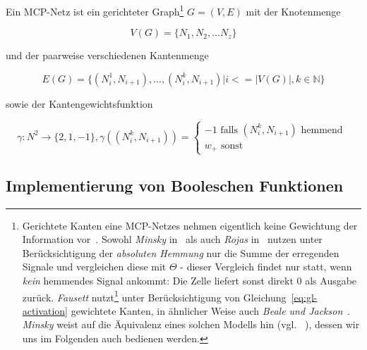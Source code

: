 \begin{definition} Ein MCP-Netz ist ein gerichteter Graph\footnote{
    Gerichtete Kanten eine MCP-Netzes nehmen eigentlich keine Gewichtung der Information vor~\cite[40]{Roj93}. Sowohl \textit{Minsky} in~\cite[34]{Min67} als auch \textit{Rojas} in~\cite[32]{Roj93} nutzen unter Berücksichtigung der \textit{absoluten Hemmung} nur die Summe der erregenden Signale und vergleichen diese mit $\Theta$ - dieser Vergleich findet nur statt, wenn \textit{kein} hemmendes Signal ankommt: Die Zelle liefert sonst direkt $0$ als Ausgabe zurück. \textit{Fausett} nutzt\footnote{
        Gewichte sind in absolut hemmenden Leitungen unsinnig nach~\cite[42]{Roj93}
    } unter Berücksichtigung von Gleichung~\ref{eq:gl-activation} gewichtete Kanten, in ähnlicher Weise auch \textit{Beale und Jackson}~\cite[41]{BJ90}. \textit{Minsky} weist auf die Äquivalenz eines solchen Modells hin (vgl. ~\cite[34 f.]{Min67}), dessen wir uns im Folgenden auch bedienen werden.
} $G = (V, E)$ mit der Knotenmenge

\begin{equation}
V(G) =\{N_1, N_2, ... N_z\}
\end{equation}

und der paarweise verschiedenen Kantenmenge

\begin{equation}
E(G) = \{ (N^1_i, N_{i+1}), ..., (N^k_i, N_{i+1}) | i <= |V(G)|, k \in \mathbb{N} \}
\end{equation}

sowie der Kantengewichtsfunktion



\begin{equation}
\gamma: N^2 \to \{2, 1, -1\}, \gamma((N^k_i, N_{i+1})) = \begin{cases}
                                                              -1 \text{ falls } (N^k_i, N_{i+1})  \text{ hemmend } \\
                                                              w_+  \text{ sonst}
\end{cases}
\end{equation}
\label{def:mcpnetz}
\end{definition}



\subsection{Implementierung von Booleschen Funktionen}\label{seq-mcpbool}

